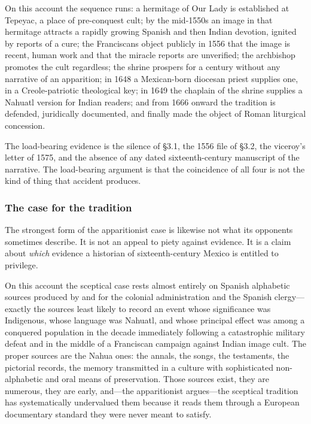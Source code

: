 On this account the sequence runs: a hermitage of Our Lady is
established at Tepeyac, a place of pre-conquest cult; by the
mid-1550s an image in that hermitage attracts a rapidly growing
Spanish and then Indian devotion, ignited by reports of a cure; the
Franciscans object publicly in 1556 that the image is recent, human
work and that the miracle reports are unverified; the archbishop
promotes the cult regardless; the shrine prospers for a century
without any narrative of an apparition; in 1648 a Mexican-born
diocesan priest supplies one, in a Creole-patriotic theological key;
in 1649 the chaplain of the shrine supplies a Nahuatl version for
Indian readers; and from 1666 onward the tradition is defended,
juridically documented, and finally made the object of Roman
liturgical concession.

The load-bearing evidence is the silence of \S3.1, the 1556 file of
\S3.2, the viceroy's letter of 1575, and the absence of any dated
sixteenth-century manuscript of the narrative. The load-bearing
argument is that the coincidence of all four is not the kind of thing
that accident produces.

\subsubsection*{The case for the tradition}

The strongest form of the apparitionist case is likewise not what its
opponents sometimes describe. It is not an appeal to piety against
evidence. It is a claim about \emph{which} evidence a historian of
sixteenth-century Mexico is entitled to privilege.

On this account the sceptical case rests almost entirely on Spanish
alphabetic sources produced by and for the colonial administration
and the Spanish clergy---exactly the sources least likely to record
an event whose significance was Indigenous, whose language was
Nahuatl, and whose principal effect was among a conquered population
in the decade immediately following a catastrophic military defeat
and in the middle of a Franciscan campaign against Indian image cult.
The proper sources are the Nahua ones: the annals, the songs, the
testaments, the pictorial records, the memory transmitted in a
culture with sophisticated non-alphabetic and oral means of
preservation. Those sources exist, they are numerous, they are early,
and---the apparitionist argues---the sceptical tradition has
systematically undervalued them because it reads them through a
European documentary standard they were never meant to satisfy.

